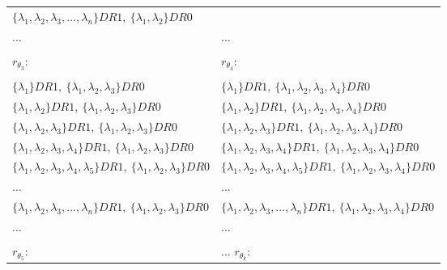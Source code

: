 \begin{table}[h!]
\begin{center}
\begin{tabular}{|l||l|}
						$\{\lambda_{1}, \lambda_{2}, \lambda_{3}, ... , \lambda_{n}\}DR1,\:\{\lambda_{1}, \lambda_{2}\}DR0$ \\				
					 	... & ... \\						
					\hline
					\hline
						\cellcolor{applegreen!50} & \cellcolor{applegreen!50}  \\
						\cellcolor{applegreen!50} {\LARGE $r_{\theta_{3}}$:  } & \cellcolor{applegreen!50} {\LARGE $r_{\theta_{4}}$:  } \\
						\cellcolor{applegreen!50} & \cellcolor{applegreen!50}  \\
					\hline
					\hline
						$\{\lambda_{1}\}DR1,\:\{\lambda_{1}, \lambda_{2}, \lambda_{3}\}DR0$ &
						$\{\lambda_{1}\}DR1,\:\{\lambda_{1}, \lambda_{2}, \lambda_{3}, \lambda_{4}\}DR0$ \\
						$\{\lambda_{1}, \lambda_{2}\}DR1,\:\{\lambda_{1}, \lambda_{2}, \lambda_{3}\}DR0$ &
						$\{\lambda_{1}, \lambda_{2}\}DR1,\:\{\lambda_{1}, \lambda_{2}, \lambda_{3}, \lambda_{4}\}DR0$ \\
						$\{\lambda_{1}, \lambda_{2}, \lambda_{3}\}DR1,\:\{\lambda_{1}, \lambda_{2}, \lambda_{3}\}DR0$ &
						$\{\lambda_{1}, \lambda_{2}, \lambda_{3}\}DR1,\:\{\lambda_{1}, \lambda_{2}, \lambda_{3}, \lambda_{4}\}DR0$ \\
						$\{\lambda_{1}, \lambda_{2}, \lambda_{3}, \lambda_{4}\}DR1,\:\{\lambda_{1}, \lambda_{2}, \lambda_{3}\}DR0$ &
						$\{\lambda_{1}, \lambda_{2}, \lambda_{3}, \lambda_{4}\}DR1,\:\{\lambda_{1}, \lambda_{2}, \lambda_{3}, \lambda_{4}\}DR0$ \\
						$\{\lambda_{1}, \lambda_{2}, \lambda_{3}, \lambda_{4}, \lambda_{5}\}DR1,\:\{\lambda_{1}, \lambda_{2}, \lambda_{3}\}DR0$ &
						$\{\lambda_{1}, \lambda_{2}, \lambda_{3}, \lambda_{4}, \lambda_{5}\}DR1,\:\{\lambda_{1}, \lambda_{2}, \lambda_{3}, \lambda_{4}\}DR0$ \\
						... & ... \\
						$\{\lambda_{1}, \lambda_{2}, \lambda_{3}, ... , \lambda_{n}\}DR1,\:\{\lambda_{1}, \lambda_{2}, \lambda_{3}\}DR0$ &
						$\{\lambda_{1}, \lambda_{2}, \lambda_{3}, ... , \lambda_{n}\}DR1,\:\{\lambda_{1}, \lambda_{2}, \lambda_{3}, \lambda_{4}\}DR0$ \\
						... & ... \\				
					\hline
					\hline
						\cellcolor{applegreen!50} & \cellcolor{applegreen!50}  \\
						\cellcolor{applegreen!50} {\LARGE $r_{\theta_{5}}$:  } & \cellcolor{applegreen!50}... {\LARGE $r_{\theta_{k}}$:  } \\

\end{tabular}
\end{center}
\end{table}
